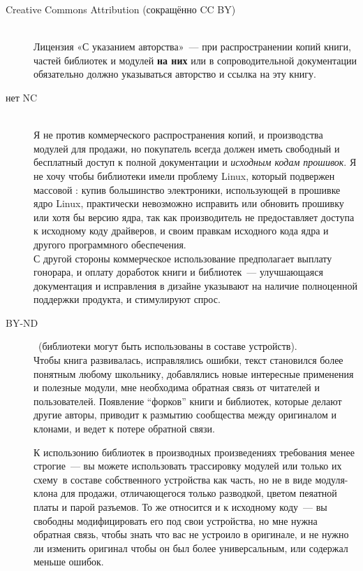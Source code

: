 \begin{description}
\item[Creative Commons Attribution (сокращённо CC BY)]\ \\
Лицензия «С указанием авторства»\ --- при распространении копий книги, частей
библиотек и модулей \textbf{на них} или в сопроводительной документации
обязательно должно указываться авторство и ссылка на эту книгу.

\item[нет NC]\ \\
Я не против коммерческого распространения копий, и производства модулей для
продажи, но покупатель всегда должен иметь свободный и бесплатный доступ
к полной документации и \emph{исходным кодам прошивок}. Я не хочу чтобы
библиотеки имели проблему Linux, который подвержен массовой :
купив большинство электроники, использующей в прошивке ядро Linux, практически
невозможно исправить или обновить прошивку или хотя бы версию ядра, так как
производитель не предоставляет доступа к исходному коду драйверов, и своим
правкам исходного кода ядра и другого программного обеспечения.\\
С другой стороны коммерческое использование предполагает выплату гонорара, и
оплату доработок книги и библиотек\ --- улучшающаяся документация и исправления
в дизайне указывают на наличие полноценной поддержки продукта, и стимулируют
спрос.

\item[BY-ND]\ (библиотеки могут быть использованы в составе устройств).\\
Чтобы книга развивалась, исправлялись ошибки, текст становился более понятным
любому школьнику, добавлялись новые интересные применения и полезные модули,
мне необходима обратная связь от читателей и пользователей. Появление
``форков'' книги и библиотек, которые делают другие авторы, приводит к размытию
сообщества между оригиналом и клонами, и ведет к потере обратной связи.

\medskip
К использонию библиотек в производных произведениях требования менее строгие\
--- вы можете использовать трассировку модулей или только их схему\note{чтобы
перетрассировать печатную плату}\ в составе собственного устройства как часть,
но не в виде модуля-клона для продажи, отличающегося только разводкой, цветом
пеяатной платы и парой разъемов. То же относится и к исходному коду\ --- вы
свободны модифицировать его под свои устройства, но мне нужна обратная связь,
чтобы знать что вас не устроило в оригинале, и не нужно ли изменить оригинал
чтобы он был более универсальным, или содержал меньше ошибок.

\end{description}

